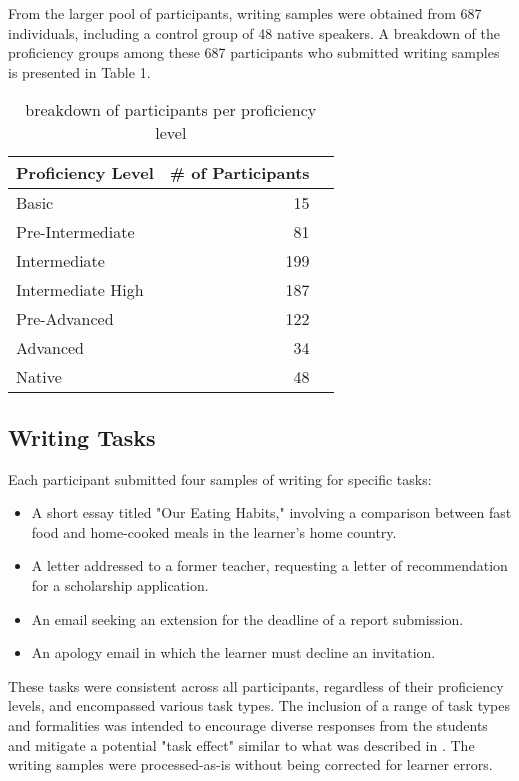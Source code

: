 From the larger pool of participants, writing samples were obtained from 687 individuals, including a control group of 48 native speakers. A breakdown of the proficiency groups among these 687 participants who submitted writing samples is presented in Table 1.

\begin{table}
\centering
\begin{tabular}{lrl}
\hline \textbf{Proficiency Level} & \textbf{\# of Participants} \\ \hline
Basic & 15 \\
Pre-Intermediate & 81 \\
Intermediate & 199\\
Intermediate High & 187 \\
Pre-Advanced & 122 \\
Advanced & 34\\
Native & 48 \\
\hline
\end{tabular}
\caption{\label{participants-chart} breakdown of participants per proficiency level}
\end{table}

\subsection{Writing Tasks}

Each participant submitted four samples of writing for specific tasks:
\begin{itemize}
    \item A short essay titled "Our Eating Habits," involving a comparison between fast food and home-cooked meals in the learner's home country.
    \item A letter addressed to a former teacher, requesting a letter of recommendation for a scholarship application.
    \item An email seeking an extension for the deadline of a report submission.
    \item An apology email in which the learner must decline an invitation.
\end{itemize}
These tasks were consistent across all participants, regardless of their proficiency levels, and encompassed various task types. The inclusion of a range of task types and formalities was intended to encourage diverse responses from the students and mitigate a potential "task effect" similar to what  was described in \cite{Alexpoulou2017}. The writing samples were processed-as-is without being corrected for learner errors.

